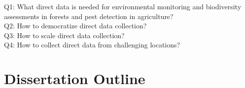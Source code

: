 %


Q1: What direct data is needed for environmental monitoring and biodiversity assessments in forests and pest detection in agriculture?\\ %
Q2: How to democratize direct data collection?\\ %
Q3: How to scale direct data collection?\\%
Q4: How to collect direct data from challenging locations?\\%



\section{Dissertation Outline}

